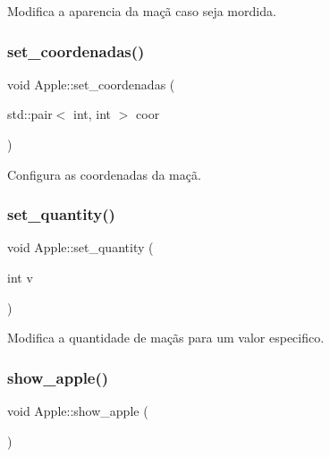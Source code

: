 Modifica a aparencia da maçã caso seja mordida. 

\mbox{\label{classApple_a591266baa919261a133e69eb1ab62a5a}} 
\subsubsection{\texorpdfstring{set\+\_\+coordenadas()}{set\_coordenadas()}}
{\footnotesize\ttfamily void Apple\+::set\+\_\+coordenadas (\begin{DoxyParamCaption}\item[{std\+::pair$<$ int, int $>$}]{coor }\end{DoxyParamCaption})\hspace{0.3cm}{\ttfamily [inline]}}



Configura as coordenadas da maçã. 

\mbox{\label{classApple_a4eeb2c0579e05d7dd4adfd6677a50a04}} 
\subsubsection{\texorpdfstring{set\+\_\+quantity()}{set\_quantity()}}
{\footnotesize\ttfamily void Apple\+::set\+\_\+quantity (\begin{DoxyParamCaption}\item[{int}]{v }\end{DoxyParamCaption})\hspace{0.3cm}{\ttfamily [inline]}}



Modifica a quantidade de maçãs para um valor especifico. 

\mbox{\label{classApple_a4a22b5b09f493a64a1276b88513ea526}} 
\subsubsection{\texorpdfstring{show\+\_\+apple()}{show\_apple()}}
{\footnotesize\ttfamily void Apple\+::show\+\_\+apple (\begin{DoxyParamCaption}{ }\end{DoxyParamCaption})\hspace{0.3cm}{\ttfamily [inline]}}



